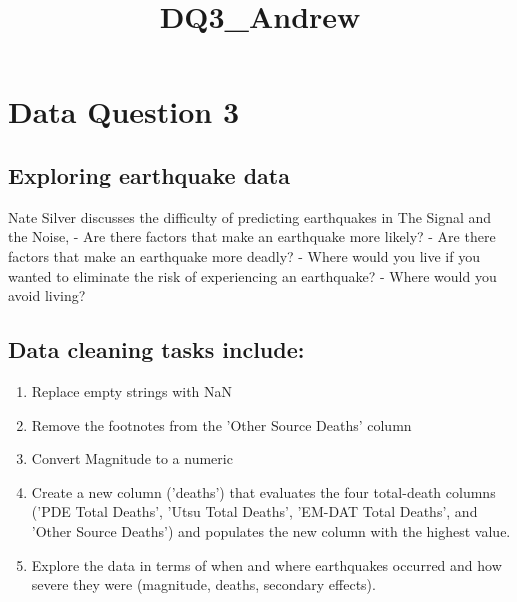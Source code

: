 \documentclass[11pt]{article}
\title{DQ3\_Andrew}
\providecommand{\tightlist}{%
      \setlength{\itemsep}{0pt}\setlength{\parskip}{0pt}}
\begin{document}
    
    
    \maketitle
    
    

    
    \section{Data Question 3}\label{data-question-3}

\subsection{Exploring earthquake data}\label{exploring-earthquake-data}

Nate Silver discusses the difficulty of predicting earthquakes in The
Signal and the Noise, - Are there factors that make an earthquake more
likely? - Are there factors that make an earthquake more deadly? - Where
would you live if you wanted to eliminate the risk of experiencing an
earthquake? - Where would you avoid living?

    \subsection{Data cleaning tasks
include:}\label{data-cleaning-tasks-include}

\begin{enumerate}
\def\labelenumi{\arabic{enumi}.}
\tightlist
\item
  Replace empty strings with NaN
\item
  Remove the footnotes from the 'Other Source Deaths' column
\item
  Convert Magnitude to a numeric
\item
  Create a new column ('deaths') that evaluates the four total-death
  columns ('PDE Total Deaths', 'Utsu Total Deaths', 'EM-DAT Total
  Deaths', and 'Other Source Deaths') and populates the new column with
  the highest value.
\item
  Explore the data in terms of when and where earthquakes occurred and
  how severe they were (magnitude, deaths, secondary effects).
\end{enumerate}
\end{document}
